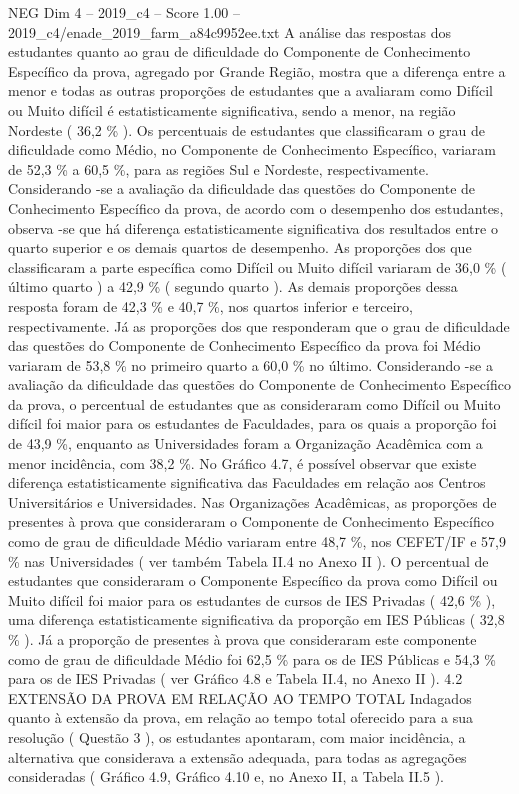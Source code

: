 \begin{textsample}{NEG Dim 4 – 2019\_c4 – Score 1.00 – 2019\_c4/enade\_2019\_farm\_a84c9952ee.txt}
A análise das respostas dos estudantes quanto ao grau de dificuldade do Componente de Conhecimento Específico da prova, agregado por Grande Região, mostra que a diferença entre a menor e todas as outras proporções de estudantes que a avaliaram como Difícil ou Muito difícil é estatisticamente significativa, sendo a menor, na região Nordeste ( 36,2 \% ).
Os percentuais de estudantes que classificaram o grau de dificuldade como Médio, no Componente de Conhecimento Específico, variaram de 52,3 \% a 60,5 \%, para as regiões Sul e Nordeste, respectivamente.
Considerando -se a avaliação da dificuldade das questões do Componente de Conhecimento Específico da prova, de acordo com o desempenho dos estudantes, observa -se que há diferença estatisticamente significativa dos resultados entre o quarto superior e os demais quartos de desempenho.
As proporções dos que classificaram a parte específica como Difícil ou Muito difícil variaram de 36,0 \% ( último quarto ) a 42,9 \% ( segundo quarto ).
As demais proporções dessa resposta foram de 42,3 \% e 40,7 \%, nos quartos inferior e terceiro, respectivamente.
Já as proporções dos que responderam que o grau de dificuldade das questões do Componente de Conhecimento Específico da prova foi Médio variaram de 53,8 \% no primeiro quarto a 60,0 \% no último.
Considerando -se a avaliação da dificuldade das questões do Componente de Conhecimento Específico da prova, o percentual de estudantes que as consideraram como Difícil ou Muito difícil foi maior para os estudantes de Faculdades, para os quais a proporção foi de 43,9 \%, enquanto as Universidades foram a Organização Acadêmica com a menor incidência, com 38,2 \%.
No Gráfico 4.7, é possível observar que existe diferença estatisticamente significativa das Faculdades em relação aos Centros Universitários e Universidades.
Nas Organizações Acadêmicas, as proporções de presentes à prova que consideraram o Componente de Conhecimento Específico como de grau de dificuldade Médio variaram entre 48,7 \%, nos CEFET/IF e 57,9 \% nas Universidades ( ver também Tabela II.4 no Anexo II ).
O percentual de estudantes que consideraram o Componente Específico da prova como Difícil ou Muito difícil foi maior para os estudantes de cursos de IES Privadas ( 42,6 \% ), uma diferença estatisticamente significativa da proporção em IES Públicas ( 32,8 \% ).
Já a proporção de presentes à prova que consideraram este componente como de grau de dificuldade Médio foi 62,5 \% para os de IES Públicas e 54,3 \% para os de IES Privadas ( ver Gráfico 4.8 e Tabela II.4, no Anexo II ). 4.2 EXTENSÃO DA PROVA EM RELAÇÃO AO TEMPO TOTAL Indagados quanto à extensão da prova, em relação ao tempo total oferecido para a sua resolução ( Questão 3 ), os estudantes apontaram, com maior incidência, a alternativa que considerava a extensão adequada, para todas as agregações consideradas ( Gráfico 4.9, Gráfico 4.10 e, no Anexo II, a Tabela II.5 ).

\end{textsample}
